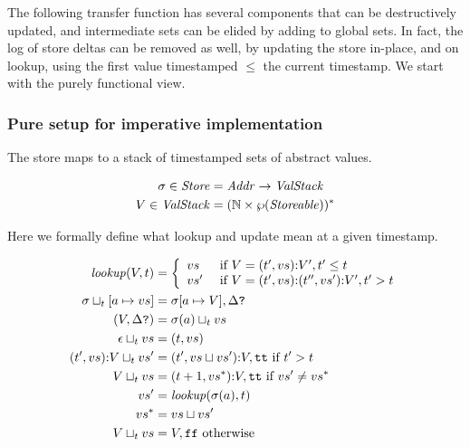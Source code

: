 \documentclass[preprint,onecolumn,9pt]{sigplanconf} %
\begin{document}
The following transfer function has several components that can be
destructively updated, and intermediate sets can be elided by adding
to global sets. In fact, the log of store deltas can be removed as
well, by updating the store in-place, and on lookup, using the first
value timestamped $\le$ the current timestamp. We start with the
purely functional view.

\subsubsection{Pure setup for imperative implementation}

The store maps to a stack of timestamped sets of abstract values.

\begin{align*}
\sigma \in \mathit{Store} &= \mathit{Addr} \to \mathit{ValStack} \\
V \in \mathit{ValStack} &= ({\mathbb N} \times \wp(\mathit{Storeable}))^*
\end{align*}

Here we formally define what lookup and update mean at a given
timestamp.

\begin{align*}
\mathit{lookup}(V,t) &=
  \left\{
    \begin{array}{ll}
      v{s} & \text{ if } V = (t', v{s}) {\tt :} V', t' \le t \\
      v{s'} & \text{ if } V = (t', v{s}) {\tt :} (t'', v{s'}) {\tt :} V', t' > t
    \end{array}\right. \\
\sigma \sqcup_t [a \mapsto v{s}] &= \sigma[a \mapsto V],\Delta\mbox{{\tt ?}} \\
 (V,\Delta\mbox{{\tt ?}}) &= \sigma(a)\sqcup_t v{s} \\
\epsilon \sqcup_t v{s} &= (t, v{s}) \\
(t', v{s}) {\tt :} V \sqcup_t v{s'} &= (t', v{s}\sqcup v{s'}) {\tt :} V,{\tt tt} \text{ if } t' > t \\
V \sqcup_t v{s} &= (t+1, v{s^*}) {\tt :} V,{\tt tt}
           \text{ if } v{s'} \neq v{s^*} \\
 v{s'} &= \mathit{lookup}(\sigma(a),t) \\
 v{s^*} &= v{s} \sqcup v{s'} \\
V \sqcup_t v{s} &= V,{\tt ff} \text{ otherwise}
\end{align*}
\end{document}

